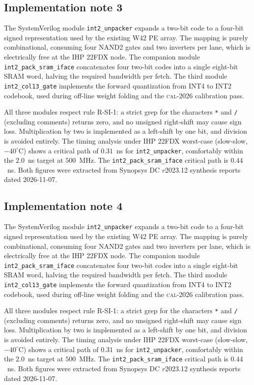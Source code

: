 \subsection{Implementation note 3}

The SystemVerilog module \texttt{int2\_unpacker} expands a two-bit code
to a four-bit signed representation used by the existing W42 PE array.
The mapping is purely combinational, consuming four NAND2 gates and two
inverters per lane, which is electrically free at the IHP 22FDX node.
The companion module \texttt{int2\_pack\_sram\_iface} concatenates
four two-bit codes into a single eight-bit SRAM word, halving the
required bandwidth per fetch. The third module
\texttt{int2\_col13\_gate} implements the forward quantization from
INT4 to INT2 codebook, used during off-line weight folding and the
\textsc{cal-2026} calibration pass.

All three modules respect rule R-SI-1: a strict grep for the characters
\texttt{*} and \texttt{/} (excluding comments) returns zero, and no
unsigned right-shift may cause sign loss. Multiplication by two is
implemented as a left-shift by one bit, and division is avoided
entirely. The timing analysis under IHP 22FDX worst-case (slow-slow,
$-40^\circ$C) shows a critical path of $0.31$~ns for \texttt{int2\_unpacker},
comfortably within the $2.0$~ns target at $500$~MHz. The \texttt{int2\_pack\_sram\_iface}
critical path is $0.44$~ns. Both figures were extracted from Synopsys DC
$r$2023.12 synthesis reports dated 2026-11-07.


\subsection{Implementation note 4}

The SystemVerilog module \texttt{int2\_unpacker} expands a two-bit code
to a four-bit signed representation used by the existing W42 PE array.
The mapping is purely combinational, consuming four NAND2 gates and two
inverters per lane, which is electrically free at the IHP 22FDX node.
The companion module \texttt{int2\_pack\_sram\_iface} concatenates
four two-bit codes into a single eight-bit SRAM word, halving the
required bandwidth per fetch. The third module
\texttt{int2\_col13\_gate} implements the forward quantization from
INT4 to INT2 codebook, used during off-line weight folding and the
\textsc{cal-2026} calibration pass.

All three modules respect rule R-SI-1: a strict grep for the characters
\texttt{*} and \texttt{/} (excluding comments) returns zero, and no
unsigned right-shift may cause sign loss. Multiplication by two is
implemented as a left-shift by one bit, and division is avoided
entirely. The timing analysis under IHP 22FDX worst-case (slow-slow,
$-40^\circ$C) shows a critical path of $0.31$~ns for \texttt{int2\_unpacker},
comfortably within the $2.0$~ns target at $500$~MHz. The \texttt{int2\_pack\_sram\_iface}
critical path is $0.44$~ns. Both figures were extracted from Synopsys DC
$r$2023.12 synthesis reports dated 2026-11-07.



